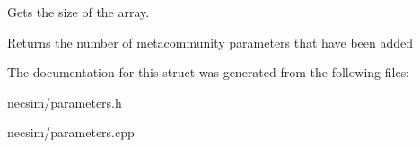 Gets the size of the array. 

\begin{DoxyReturn}{Returns}
the number of metacommunity parameters that have been added 
\end{DoxyReturn}


The documentation for this struct was generated from the following files\+:\begin{DoxyCompactItemize}
\item 
necsim/parameters.\+h\item 
necsim/parameters.\+cpp\end{DoxyCompactItemize}
